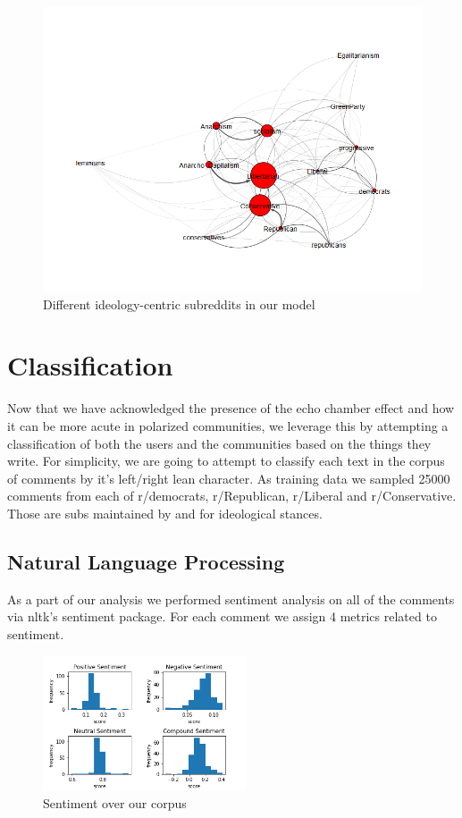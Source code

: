 \documentclass[11pt]{article}
\begin{document}
\begin{figure}[h]
	\includegraphics[width=\columnwidth]{img/ideology_network.png}
	\caption{\label{ideology_net} Different ideology-centric subreddits in our model}
\end{figure}

\section{Classification}

Now that we have acknowledged the presence of the echo chamber effect and how it can be more acute in polarized communities, we leverage this by attempting a classification of both the users and the communities based on the things they write. For simplicity, we are going to attempt to classify each text in the corpus of comments by it's left/right lean character.
As training data we sampled 25000 comments from each of r/democrats, r/Republican, r/Liberal and r/Conservative. Those are subs maintained by and for ideological stances.

\subsection{Natural Language Processing}

As a part of our analysis we performed sentiment analysis on all of the comments via nltk's sentiment package. For each comment we assign 4 metrics related to sentiment.

\begin{figure}[h]
	\includegraphics[width=\columnwidth,height=4cm]{img/sent_dist_total.png}
	\caption{Sentiment over our corpus}
\end{figure}
\end{document}
